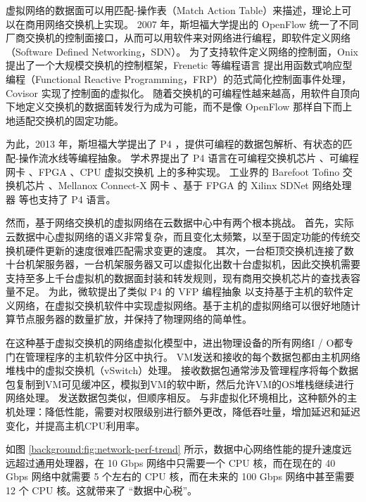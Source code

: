 虚拟网络的数据面可以用匹配-操作表（Match Action Table）来描述，理论上可以在商用网络交换机上实现。
2007 年，斯坦福大学提出的 OpenFlow \cite{mckeown2008openflow} 统一了不同厂商交换机的控制面接口，从而可以用软件来对网络进行编程，即软件定义网络（Software Defined Networking，SDN）。
为了支持软件定义网络的控制面，Onix \cite{koponen2010onix} 提出了一个大规模交换机的控制框架，Frenetic 等编程语言 \cite{voellmy2010nettle,foster2011frenetic} 提出用函数式响应型编程（Functional Reactive Programming，FRP）的范式简化控制面事件处理，Covisor \cite{jin2015covisor} 实现了控制面的虚拟化。
随着交换机的可编程性越来越高，用软件自顶向下地定义交换机的数据面转发行为成为可能，而不是像 OpenFlow 那样自下而上地适配交换机的固定功能。

为此，2013 年，斯坦福大学提出了 P4 \cite{bosshart2014p4}，提供可编程的数据包解析、有状态的匹配-操作流水线等编程抽象。
学术界提出了 P4 语言在可编程交换机芯片 \cite{bosshart2013forwarding}、可编程网卡 \cite{kaufmann2016high}、FPGA \cite{wang2017p4fpga}、CPU 虚拟交换机 \cite{shahbaz2016pisces} 上的多种实现。
工业界的 Barefoot Tofino 交换机芯片 \cite{barefoot-tofino}、Mellanox Connect-X 网卡 \cite{mellanox}、基于 FPGA 的 Xilinx SDNet 网络处理器 \cite{xilinx-p4} 等也支持了 P4 语言。

然而，基于网络交换机的虚拟网络在云数据中心中有两个根本挑战。
首先，实际云数据中心虚拟网络的语义非常复杂，而且变化太频繁，以至于固定功能的传统交换机硬件更新的速度很难匹配需求变更的速度。
其次，一台柜顶交换机连接了数十台机架服务器，一台机架服务器又可以虚拟化出数十台虚拟机，因此交换机需要支持至多上千台虚拟机的数据面封装和转发规则，现有商用交换机芯片的查找表容量不足。
为此，微软提出了类似 P4 的 VFP 编程抽象 \cite{firestone2017vfp} 以支持基于主机的软件定义网络，在虚拟交换机软件中实现虚拟网络。基于主机的虚拟网络可以很好地随计算节点服务器的数量扩放，并保持了物理网络的简单性。

在这种基于虚拟交换机的网络虚拟化模型中，进出物理设备的所有网络I / O都专门在管理程序的主机软件分区中执行。 VM发送和接收的每个数据包都由主机网络堆栈中的虚拟交换机（vSwitch）处理。 接收数据包通常涉及管理程序将每个数据包复制到VM可见缓冲区，模拟到VM的软中断，然后允许VM的OS堆栈继续进行网络处理。 发送数据包类似，但顺序相反。 与非虚拟化环境相比，这种额外的主机处理：降低性能，需要对权限级别进行额外更改，降低吞吐量，增加延迟和延迟变化，并提高主机CPU利用率。

如图 \ref{background:fig:network-perf-trend} 所示，数据中心网络性能的提升速度远远超过通用处理器，在 10 Gbps 网络中只需要一个 CPU 核，而在现在的 40 Gbps 网络中就需要 5 个左右的 CPU 核，而在未来的 100 Gbps 网络中甚至需要 12 个 CPU 核。这就带来了 ``数据中心税''。





